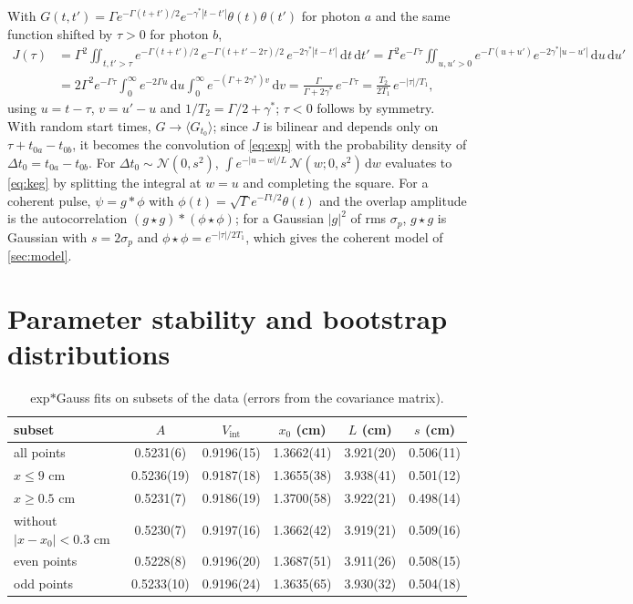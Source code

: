 \documentclass{article}
\newcommand{\Vi}{V_{\mathrm{int}}}
\newcommand{\dd}{\mathrm{d}}
\begin{document}
With $G(t,t')=\Gamma e^{-\Gamma(t+t')/2}e^{-\gamma^*|t-t'|}\theta(t)\theta(t')$
for photon $a$ and the same function shifted by $\tau>0$ for photon $b$,
\begin{align*}
J(\tau) &= \Gamma^2\iint_{t,t'>\tau} e^{-\Gamma(t+t')/2}\,
          e^{-\Gamma(t+t'-2\tau)/2}\, e^{-2\gamma^*|t-t'|}\,\dd t\,\dd t'
        = \Gamma^2 e^{-\Gamma\tau}\iint_{u,u'>0}
          e^{-\Gamma(u+u')}e^{-2\gamma^*|u-u'|}\,\dd u\,\dd u' \\
        &= 2\Gamma^2 e^{-\Gamma\tau}\int_0^\infty e^{-2\Gamma u}\,\dd u
          \int_0^\infty e^{-(\Gamma+2\gamma^*)v}\,\dd v
        = \frac{\Gamma}{\Gamma+2\gamma^*}\,e^{-\Gamma\tau}
        = \frac{T_2}{2T_1}\,e^{-|\tau|/T_1},
\end{align*}
using $u=t-\tau$, $v=u'-u$ and $1/T_2=\Gamma/2+\gamma^*$; $\tau<0$ follows by
symmetry. With random start times, $G\to\langle G_{t_0}\rangle$; since $J$ is
bilinear and depends only on $\tau+t_{0a}-t_{0b}$, it becomes the
convolution of \cref{eq:exp} with the probability density of
$\Delta t_0=t_{0a}-t_{0b}$. For $\Delta t_0\sim\mathcal N(0,s^2)$,
$\int e^{-|u-w|/L}\,\mathcal N(w;0,s^2)\,\dd w$ evaluates to \cref{eq:keg}
by splitting the integral at $w=u$ and completing the square. For a
coherent pulse, $\psi = g\ast\phi$ with $\phi(t)=\sqrt\Gamma
e^{-\Gamma t/2}\theta(t)$ and the overlap amplitude is the autocorrelation
$(g\star g)\ast(\phi\star\phi)$; for a Gaussian $|g|^2$ of rms $\sigma_p$,
$g\star g$ is Gaussian with $s=2\sigma_p$ and $\phi\star\phi=e^{-|\tau|/2T_1}$,
which gives the coherent model of \cref{sec:model}.

\section{Parameter stability and bootstrap distributions}
\label{app:subsets}

\begin{table}[h]
  \caption{exp$\ast$Gauss fits on subsets of the data (errors from the
  covariance matrix).}
  \vskip 0.05in
  \centering
  \small
  \begin{tabular}{lccccc}
    \toprule
    subset & $A$ & $\Vi$ & $x_0$ (cm) & $L$ (cm) & $s$ (cm) \\
    \midrule
    all points           & 0.5231(6)  & 0.9196(15) & 1.3662(41) & 3.921(20) & 0.506(11) \\
    $x\le 9$ cm          & 0.5236(19) & 0.9187(18) & 1.3655(38) & 3.938(41) & 0.501(12) \\
    $x\ge 0.5$ cm        & 0.5231(7)  & 0.9186(19) & 1.3700(58) & 3.922(21) & 0.498(14) \\
    without $|x-x_0|<0.3$ cm & 0.5230(7) & 0.9197(16) & 1.3662(42) & 3.919(21) & 0.509(16) \\
    even points          & 0.5228(8)  & 0.9196(20) & 1.3687(51) & 3.911(26) & 0.508(15) \\
    odd points           & 0.5233(10) & 0.9196(24) & 1.3635(65) & 3.930(32) & 0.504(18) \\
    \bottomrule
  \end{tabular}
\end{table}
\end{document}
